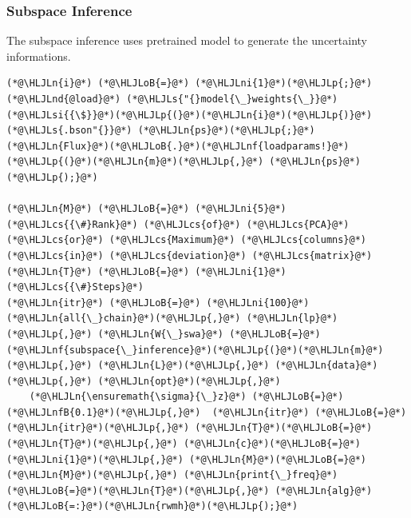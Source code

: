 \documentclass[12pt,a4paper]{article}
\newcommand{\HLJLn}[1]{#1}
\newcommand{\HLJLnd}[1]{\textcolor[RGB]{214,102,97}{#1}}
\newcommand{\HLJLnf}[1]{\textcolor[RGB]{66,102,213}{#1}}
\newcommand{\HLJLs}[1]{\textcolor[RGB]{201,61,57}{#1}}
\newcommand{\HLJLsi}[1]{#1}
\newcommand{\HLJLnfB}[1]{\textcolor[RGB]{59,151,46}{#1}}
\newcommand{\HLJLni}[1]{\textcolor[RGB]{59,151,46}{#1}}
\newcommand{\HLJLoB}[1]{\textcolor[RGB]{102,102,102}{\textbf{#1}}}
\newcommand{\HLJLp}[1]{#1}
\newcommand{\HLJLcs}[1]{\textcolor[RGB]{153,153,119}{\textit{#1}}}
\begin{document}
\subsubsection{Subspace Inference}
The subspace inference uses pretrained model to generate the uncertainty informations. 


\begin{lstlisting}
(*@\HLJLn{i}@*) (*@\HLJLoB{=}@*) (*@\HLJLni{1}@*)(*@\HLJLp{;}@*)
(*@\HLJLnd{@load}@*) (*@\HLJLs{"{}model{\_}weights{\_}}@*)(*@\HLJLsi{{\$}}@*)(*@\HLJLp{(}@*)(*@\HLJLn{i}@*)(*@\HLJLp{)}@*)(*@\HLJLs{.bson"{}}@*) (*@\HLJLn{ps}@*)(*@\HLJLp{;}@*)
(*@\HLJLn{Flux}@*)(*@\HLJLoB{.}@*)(*@\HLJLnf{loadparams!}@*)(*@\HLJLp{(}@*)(*@\HLJLn{m}@*)(*@\HLJLp{,}@*) (*@\HLJLn{ps}@*)(*@\HLJLp{);}@*)

(*@\HLJLn{M}@*) (*@\HLJLoB{=}@*) (*@\HLJLni{5}@*) (*@\HLJLcs{{\#}Rank}@*) (*@\HLJLcs{of}@*) (*@\HLJLcs{PCA}@*) (*@\HLJLcs{or}@*) (*@\HLJLcs{Maximum}@*) (*@\HLJLcs{columns}@*) (*@\HLJLcs{in}@*) (*@\HLJLcs{deviation}@*) (*@\HLJLcs{matrix}@*)
(*@\HLJLn{T}@*) (*@\HLJLoB{=}@*) (*@\HLJLni{1}@*) (*@\HLJLcs{{\#}Steps}@*)
(*@\HLJLn{itr}@*) (*@\HLJLoB{=}@*) (*@\HLJLni{100}@*)
(*@\HLJLn{all{\_}chain}@*)(*@\HLJLp{,}@*) (*@\HLJLn{lp}@*)(*@\HLJLp{,}@*) (*@\HLJLn{W{\_}swa}@*) (*@\HLJLoB{=}@*) (*@\HLJLnf{subspace{\_}inference}@*)(*@\HLJLp{(}@*)(*@\HLJLn{m}@*)(*@\HLJLp{,}@*) (*@\HLJLn{L}@*)(*@\HLJLp{,}@*) (*@\HLJLn{data}@*)(*@\HLJLp{,}@*) (*@\HLJLn{opt}@*)(*@\HLJLp{,}@*)
	(*@\HLJLn{\ensuremath{\sigma}{\_}z}@*) (*@\HLJLoB{=}@*) (*@\HLJLnfB{0.1}@*)(*@\HLJLp{,}@*)	(*@\HLJLn{itr}@*) (*@\HLJLoB{=}@*)(*@\HLJLn{itr}@*)(*@\HLJLp{,}@*) (*@\HLJLn{T}@*)(*@\HLJLoB{=}@*)(*@\HLJLn{T}@*)(*@\HLJLp{,}@*) (*@\HLJLn{c}@*)(*@\HLJLoB{=}@*)(*@\HLJLni{1}@*)(*@\HLJLp{,}@*) (*@\HLJLn{M}@*)(*@\HLJLoB{=}@*)(*@\HLJLn{M}@*)(*@\HLJLp{,}@*) (*@\HLJLn{print{\_}freq}@*)(*@\HLJLoB{=}@*)(*@\HLJLn{T}@*)(*@\HLJLp{,}@*) (*@\HLJLn{alg}@*) (*@\HLJLoB{=:}@*)(*@\HLJLn{rwmh}@*)(*@\HLJLp{);}@*)



\end{lstlisting}
\end{document}
